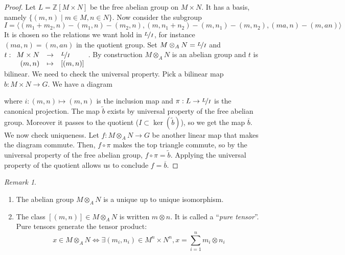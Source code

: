 \documentclass{article}
\newcommand{\Z}{\mathbb{Z}}
\newcommand{\applic}[4]{\begin{array}[t]{rcl}
#1 & \to & #2 \\
#3 & \mapsto & #4
\end{array}}
\theoremstyle{plain}
\theoremstyle{definition}
\theoremstyle{remark}
\newtheorem*{remark}{Remark}
\begin{document}
\begin{proof}
    Let $L = \Z[M\times N]$ be the free abelian group on $M\times N$. It has a basis, namely $\{(m,n) \mid m \in M, n\in N\}$. Now consider the subgroup
    \[I = \langle (m_1+m_2,n) - (m_1,n) - (m_2,n), (m,n_1+n_2) - (m,n_1) - (m,n_2), (ma,n) - (m,an)\rangle\]
    It is chosen so the relations we want hold in $\nicefrac{L}{I}$, for instance $(ma,n) = (m,an)$ in the quotient group. Set $M \otimes_A N = \nicefrac{L}{I}$ and $t : \applic{M\times N}{\nicefrac{L}{I}}{(m,n)}{[(m,n)]}$. By construction $M \otimes_A N$ is an abelian group and $t$ is bilinear. We need to check the universal property. Pick a bilinear map $b : M \times N \to G$. We have a diagram
    \begin{center}
    \end{center}
    where $i : (m,n) \mapsto (m,n)$ is the inclusion map and $\pi : L\to \nicefrac{L}{I}$ is the canonical projection. The map $\tilde{b}$ exists by universal property of the free abelian group. Moreover it passes to the quotient ($I \subset \ker (\tilde{b})$), so we get the map $\overline{b}$. We now check uniqueness. Let $f : M\otimes_A N \to G$ be another linear map that makes the diagram commute. Then, $f \circ \pi$ makes the top triangle commute, so by the universal property of the free abelian group, $f \circ \pi = \tilde{b}$. Applying the universal property of the quotient allows us to conclude $f = \overline{b}$.
\end{proof}

\begin{remark} \leavevmode
    \begin{enumerate}
        \item The abelian group $M \otimes_A N$ is a unique up to unique isomorphism.
        \item The class $[(m,n)] \in M \otimes_A N$ is written $m \otimes n$. It is called a ``\emph{pure tensor}''. Pure tensors generate the tensor product:
        \[x \in M\otimes_A N \iff \exists (m_i,n_i) \in M^n \times N^n, x= \sum_{i=1}^n m_i \otimes n_i\]
    \end{enumerate}
\end{remark}
\end{document}
